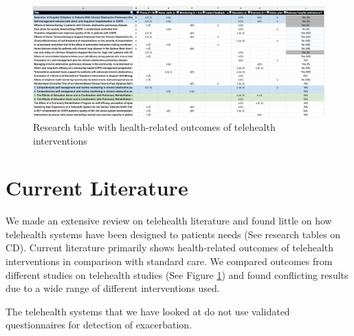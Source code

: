 

\begin{figure}[!h] \centering
			\includegraphics[width=1\textwidth]{Images/telehealth/thInitial.png}
		\caption{Research table with health-related outcomes of telehealth interventions} \label{fig:thInitial}
\end{figure}

\section{Current Literature}
We made an extensive review on telehealth literature and found little on how telehealth systems have been designed to patients needs (See research tables on CD). Current literature primarily shows health-related outcomes of telehealth interventions in comparison with standard care. We compared outcomes from different studies on telehealth studies (See Figure \ref{fig:thInitial}) and found conflicting results due to a wide range of different interventions used. 

The telehealth systems that we have looked at do not use validated questionnaires for detection of exacerbation.
